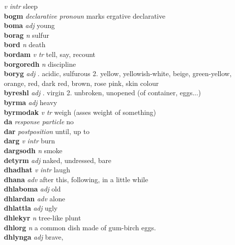   \emph{v intr} \textperiodcentered sleep\\\textbf{bogm}   \emph{declarative pronoun} \textperiodcentered marks ergative declarative\\\textbf{boma}   \emph{adj} \textperiodcentered young\\\textbf{borag}   \emph{n} \textperiodcentered sulfur\\\textbf{bord}   \emph{n} \textperiodcentered death\\\textbf{bordam}   \emph{v tr} \textperiodcentered tell, say, recount\\\textbf{borgoredh}   \emph{n} \textperiodcentered discipline\\\textbf{boryg}   \emph{adj} . acidic, sulfurous 2. yellow, yellowish-white, beige, green-yellow, orange, red, dark red, brown, rose pink, skin colour \\\textbf{byreshl}   \emph{adj} . virgin 2. unbroken, unopened (of container, eggs...) \\\textbf{byrma}   \emph{adj} \textperiodcentered heavy\\\textbf{byrmodak}   \emph{v tr} \textperiodcentered weigh (asses weight of something)\\\textbf{da}   \emph{response particle} \textperiodcentered no\\\textbf{dar}   \emph{postposition} \textperiodcentered until, up to\\\textbf{darg}   \emph{v intr} \textperiodcentered burn\\\textbf{dargsodh}   \emph{n} \textperiodcentered smoke\\\textbf{detyrm}   \emph{adj} \textperiodcentered naked, undressed, bare\\\textbf{dhadhat}   \emph{v intr} \textperiodcentered laugh\\\textbf{dhana}   \emph{adv} \textperiodcentered after this, following, in a little while\\\textbf{dhlaboma}   \emph{adj} \textperiodcentered old\\\textbf{dhlardan}   \emph{adv} \textperiodcentered alone\\\textbf{dhlattla}   \emph{adj} \textperiodcentered ugly\\\textbf{dhlekyr}   \emph{n} \textperiodcentered tree-like plunt\\\textbf{dhlorg}   \emph{n} \textperiodcentered a common dish made of gum-birch eggs.\\\textbf{dhlynga}   \emph{adj} \textperiodcentered brave, 